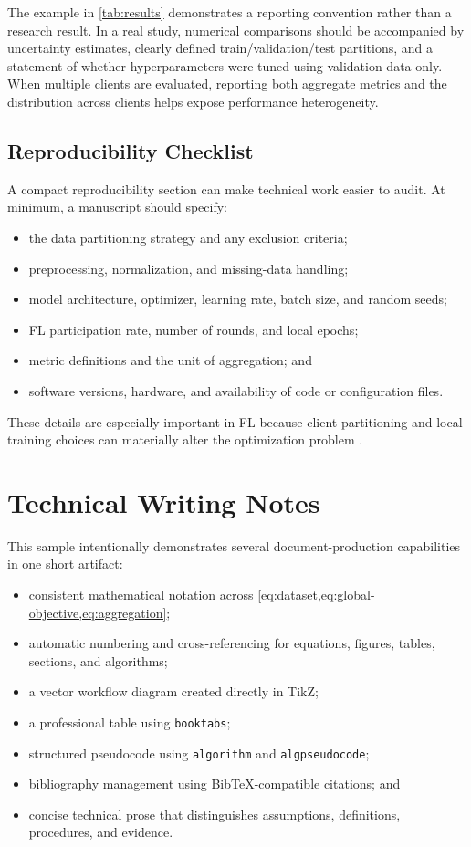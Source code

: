 \documentclass[10pt]{article}
\begin{document}
The example in \cref{tab:results} demonstrates a reporting convention rather than a research result. In a real study, numerical comparisons should be accompanied by uncertainty estimates, clearly defined train/validation/test partitions, and a statement of whether hyperparameters were tuned using validation data only. When multiple clients are evaluated, reporting both aggregate metrics and the distribution across clients helps expose performance heterogeneity.

\subsection{Reproducibility Checklist}

A compact reproducibility section can make technical work easier to audit. At minimum, a manuscript should specify:
\begin{itemize}
    \item the data partitioning strategy and any exclusion criteria;
    \item preprocessing, normalization, and missing-data handling;
    \item model architecture, optimizer, learning rate, batch size, and random seeds;
    \item FL participation rate, number of rounds, and local epochs;
    \item metric definitions and the unit of aggregation; and
    \item software versions, hardware, and availability of code or configuration files.
\end{itemize}

These details are especially important in FL because client partitioning and local training choices can materially alter the optimization problem \citep{li2020federated}.

\section{Technical Writing Notes}

This sample intentionally demonstrates several document-production capabilities in one short artifact:
\begin{itemize}
    \item consistent mathematical notation across \cref{eq:dataset,eq:global-objective,eq:aggregation};
    \item automatic numbering and cross-referencing for equations, figures, tables, sections, and algorithms;
    \item a vector workflow diagram created directly in TikZ;
    \item a professional table using \texttt{booktabs};
    \item structured pseudocode using \texttt{algorithm} and \texttt{algpseudocode};
    \item bibliography management using BibTeX-compatible citations; and
    \item concise technical prose that distinguishes assumptions, definitions, procedures, and evidence.
\end{itemize}
\end{document}
